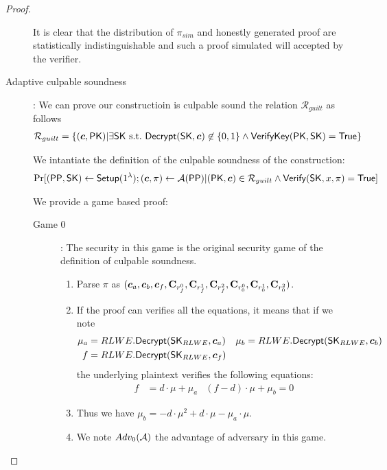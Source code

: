 \begin{proof}
\begin{description}
    It is clear that the distribution of $\pi_{sim}$ and honestly generated proof are statistically indistinguishable and such a proof simulated will accepted by the verifier.
    
  \item[\textsf{Adaptive culpable soundness}]:
    We can prove our constructioin is culpable sound \wrt the relation $\mathcal{R}_{guilt}$ as follows
    \begin{align*}
      \mathcal{R}_{guilt} &= \{(\vec{c}, \PK) | \exists \SK~\st~\Dec(\SK, \vec{c}) \not \in \{0,1\}  \wedge {\mathsf{VerifyKey}}(\PK, \SK)  = \True\}
    \end{align*}

    We intantiate the definition of the culpable soundness of the construction:
    \begin{align*}
      \Pr[(\PPP, \SK) \gets \Setup(1^{\lambda}); (\vec{c}, \pi) \gets \Adv(\PPP) | (\PK, \vec{c}) \in \mathcal{R}_{guilt} \wedge \Verif(\SK, x, \pi) = \True]
    \end{align*}

    We provide a game based proof:
    \begin{description}
    \item[\textsf{Game} $0$]: The security in this game is the original security game of the definition of culpable soundness.
      \begin{enumerate}
      \item Parse $\pi$ as $(\vec{c}_a, \vec{c}_b, \vec{c}_f, \mat{C}_{r_f^0}, \mat{C}_{r_f^1}, \mat{C}_{r_f^2}, \mat{C}_{r_0^0}, \mat{C}_{r_0^1}, \mat{C}_{r_0^2})$.
      \item If the proof can verifies all the equations, it means that if we note
        \begin{align*}
          \mu_a &= RLWE.\Dec(\SK_{RLWE}, \vec{c}_a) & \mu_b &= RLWE.\Dec(\SK_{RLWE}, \vec{c}_b) \\
          f &= RLWE.\Dec(\SK_{RLWE}, \vec{c}_f)
        \end{align*}
        the underlying plaintext verifies the following equations:
        \begin{align*}
          f &= d \cdot \mu + \mu_a & (f - d) \cdot \mu + \mu_b = 0
        \end{align*}
      \item Thus we have $\mu_b = - d \cdot \mu^2 + d \cdot \mu - \mu_a \cdot \mu$.
      \item We note $Adv_0(\mathcal{A})$ the advantage of adversary in this game.
      \end{enumerate}


\end{description}
\end{description}
\end{proof}
